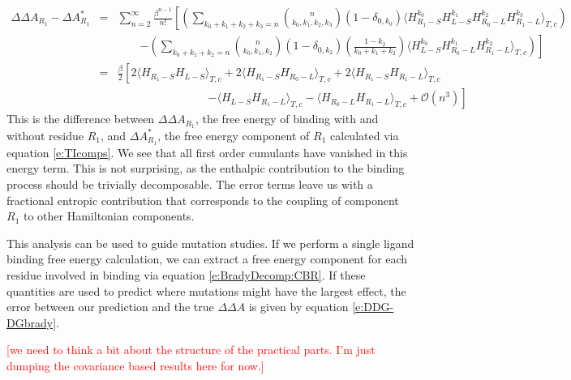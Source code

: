 \documentclass[%
 preprint,
 amsmath,amssymb,
 aps,
]{revtex4-1}
\newcommand{\warning}[1]{{\textsf{{\textcolor{red}{{[#1]}{}}}}}}
\begin{document}
 \begin{eqnarray}
 \Delta \Delta A_{R_1} - \Delta A^*_{R_1}  &=&
 \sum_{n=2}^{\infty}  \frac{\beta^{n-1}}{n!} 
\left[
\left(
 \sum_{k_0+k_1+k_2+k_3=n} 
{ n \choose k_0,k_1,k_2,k_3 }  \left( 1- \delta_{0,k_0} \right) \langle  H_{R_1-S}^{k_0} H_{L-S}^{k_1} H_{R_0-L}^{k_2} H_{R_1-L}^{k_3} 
\rangle_{T,c}
\right) \right.  \nonumber \\ && \qquad \left. 
- 
\left(
 \sum_{k_0+k_1+k_2=n} 
{ n \choose k_0,k_1,k_2 }  \left( 1- \delta_{0,k_2} \right)\left( \frac{1-k_2}{k_0+k_1+k_2} \right) \langle  H_{L-S}^{k_0} H_{R_0-L}^{k_1} H_{R_1-L}^{k_2} 
\rangle_{T,c}
\right) 
\right] \nonumber \\ & = &
\frac{\beta}{2} \left[ 
2\langle  H_{R_1-S} H_{L-S} \rangle_{T,c} + 2\langle  H_{R_1-S} H_{R_0-L} \rangle_{T,c}
+2 \langle  H_{R_1-S} H_{R_1-L} \rangle_{T,c}
\right. \nonumber \\ & & \qquad \qquad \qquad \qquad \left. 
- \langle  H_{L-S} H_{R_1-L} \rangle_{T,c} -  \langle  H_{R_0-L} H_{R_1-L} \rangle_{T,c}
+ \mathcal{O} (n^3)
\right]
\label{e:DDG-DGbrady}
 \end{eqnarray}
 This is the difference between $\Delta \Delta A_{R_1}$, the free energy of binding with and without residue $R_1$, and $\Delta A^*_{R_1}$, the free
 energy component of $R_1$ calculated via equation \ref{e:TIcomps}.   
 We see that all first order cumulants have vanished in this energy term.  This is not surprising, as the enthalpic contribution to the binding process should 
 be trivially decomposable.  The error terms leave us with a fractional entropic contribution that corresponds to the coupling of component $R_1$ to other Hamiltonian components.
 
 This analysis can be used to guide mutation studies.  If we perform a single ligand binding free energy calculation, we can extract a free energy component for each residue involved in binding via equation \ref{e:BradyDecomp:CBR}.  If these quantities are used to predict where mutations might have the largest effect, the error between our prediction and the true $\Delta \Delta A$ is given by equation \ref{e:DDG-DGbrady}.  

\warning{we need to think a bit about the structure of the practical parts. I'm just dumping the covariance based results here for now.}
\end{document}
